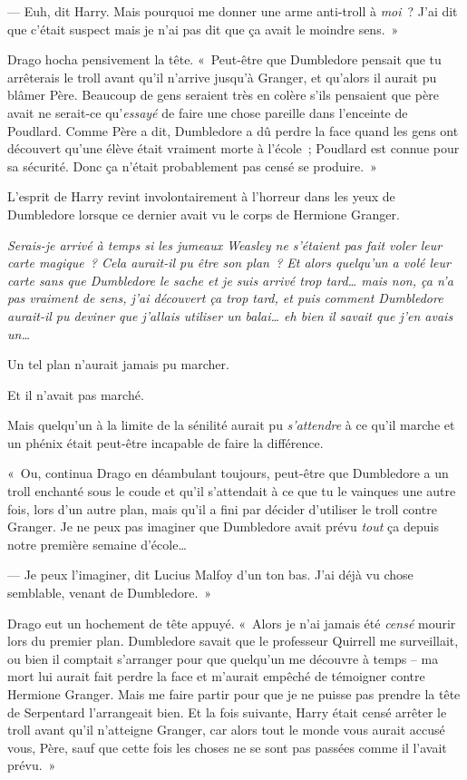 --- Euh, dit Harry.
Mais pourquoi me donner une arme anti-troll à \emph{moi}~?
J'ai dit que c'était suspect mais je n'ai pas dit que ça avait le moindre sens.~»

Drago hocha pensivement la tête.
«~Peut-être que Dumbledore pensait que tu arrêterais le troll avant qu'il n'arrive jusqu'à Granger, et qu'alors il aurait pu blâmer Père.
Beaucoup de gens seraient très en colère s'ils pensaient que père avait ne serait-ce qu'\emph{essayé} de faire une chose pareille dans l'enceinte de Poudlard.
Comme Père a dit, Dumbledore a dû perdre la face quand les gens ont découvert qu'une élève était vraiment morte à l'école~; Poudlard est connue pour sa sécurité.
Donc ça n'était probablement pas censé se produire.~»

L'esprit de Harry revint involontairement à l'horreur dans les yeux de Dumbledore lorsque ce dernier avait vu le corps de Hermione Granger.

\emph{Serais-je arrivé à temps si les jumeaux Weasley ne s'étaient pas fait voler leur carte magique~?
Cela aurait-il pu être son plan~?
Et alors quelqu'un a volé leur carte sans que Dumbledore le sache et je suis arrivé trop tard… mais non, ça n'a pas vraiment de sens, j'ai découvert ça trop tard, et puis comment Dumbledore aurait-il pu deviner que j'allais utiliser un balai… eh bien il savait que j'en avais un…}

Un tel plan n'aurait jamais pu marcher.

Et il n'avait pas marché.

Mais quelqu'un à la limite de la sénilité aurait pu \emph{s'attendre} à ce qu'il marche et un phénix était peut-être incapable de faire la différence.

«~Ou, continua Drago en déambulant toujours, peut-être que Dumbledore a un troll enchanté sous le coude et qu'il s'attendait à ce que tu le vainques une autre fois, lors d'un autre plan, mais qu'il a fini par décider d'utiliser le troll contre Granger.
Je ne peux pas imaginer que Dumbledore avait prévu \emph{tout} ça depuis notre première semaine d'école…

--- Je peux l'imaginer, dit Lucius Malfoy d'un ton bas.
J'ai déjà vu chose semblable, venant de Dumbledore.~»

Drago eut un hochement de tête appuyé.
«~Alors je n'ai jamais été \emph{censé} mourir lors du premier plan.
Dumbledore savait que le professeur Quirrell me surveillait, ou bien il comptait s'arranger pour que quelqu'un me découvre à temps -- ma mort lui aurait fait perdre la face et m'aurait empêché de témoigner contre Hermione Granger.
Mais me faire partir pour que je ne puisse pas prendre la tête de Serpentard l'arrangeait bien.
Et la fois suivante, Harry était censé arrêter le troll avant qu'il n'atteigne Granger, car alors tout le monde vous aurait accusé vous, Père, sauf que cette fois les choses ne se sont pas passées comme il l'avait prévu.~»


